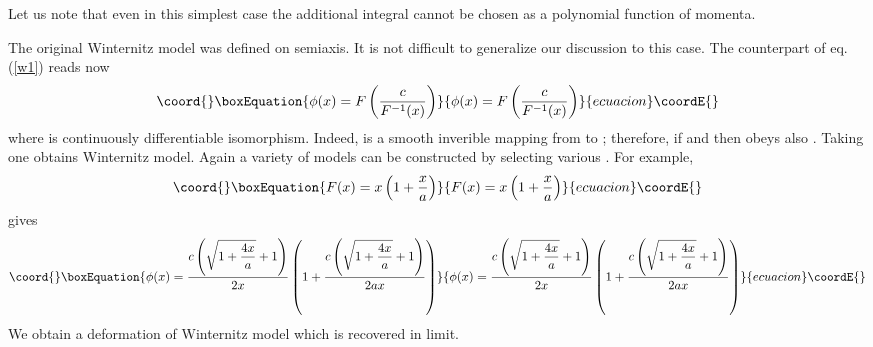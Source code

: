 \documentclass[a4paper,12pt]{article}
\providecommand{\mId}{\mbox{\rm id}}
\providecommand{\mR}{{\mathbb R}}
\begin{document}
Let us note that even in this simplest case the additional integral cannot be chosen as a polynomial
function of momenta.

The original Winternitz model was defined on semiaxis. It is not difficult to generalize our
discussion to this case. The counterpart of eq.(\ref{w1}) reads now
\begin{equation}\coord{}\boxEquation{
\phi(x)=F\left(\frac{c}{F^{-1}(x)}\right)
\label{w16}
}{
\phi(x)=F\left(\frac{c}{F^{-1}(x)}\right)
}{ecuacion}\coordE{}\end{equation}
where \myHighlight{$F:\mR_{+}\rightarrow\mR_{+}$}\coordHE{} is continuously differentiable isomorphism. Indeed, 
\coordHE{} is a smooth inverible mapping from \myHighlight{$\mR_{+}$}\coordHE{} to \myHighlight{$\mR$}\coordHE{}; therefore, if \myHighlight{$\phi:\mR\rightarrow\mR$}\coordHE{}
and \myHighlight{$\phi\circ\phi=\mId$}\coordHE{} then \myHighlight{$\tilde{\phi}=l^{-1}\circ\phi\circ l:\mR_{+}\rightarrow\mR_{+}$}\coordHE{} obeys
also \myHighlight{$\tilde{\phi}\circ\tilde{\phi}=\mId$}\coordHE{}. Taking \coordHE{} one obtains Winternitz
model. Again a variety of models can be constructed by selecting various \coordHE{}. For example,
\begin{equation}\coord{}\boxEquation{
F(x)=x\left(1+\frac{x}{a}\right)
\label{w17}
}{
F(x)=x\left(1+\frac{x}{a}\right)
}{ecuacion}\coordE{}\end{equation}
gives
\begin{equation}\coord{}\boxEquation{
\phi(x)=
\frac{\displaystyle c\left(\sqrt{1+\frac{4x}{a}}+1\right)}{\displaystyle 2x}
\left(1+
\frac{\displaystyle c\left(\sqrt{1+\frac{4x}{a}}+1\right)}{\displaystyle 2ax}\right)
\label{w18}
}{
\phi(x)=
\frac{\displaystyle c\left(\sqrt{1+\frac{4x}{a}}+1\right)}{\displaystyle 2x}
\left(1+
\frac{\displaystyle c\left(\sqrt{1+\frac{4x}{a}}+1\right)}{\displaystyle 2ax}\right)
}{ecuacion}\coordE{}\end{equation}
We obtain a deformation of Winternitz model which is recovered in \coordHE{} limit.
\end{document}
